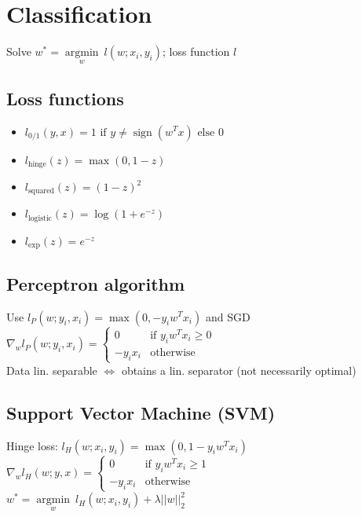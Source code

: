 \section*{Classification}

Solve $w^* = \underset{w}{\operatorname{argmin}} ~ l(w;x_i,y_i)$; loss function $l$

\subsection*{Loss functions}
\begin{itemize}
	\item $l_{0/1} (y,x) = 1 \text{ if } y \neq \operatorname{sign}(w^Tx) \text{ else } 0$
	\item $l_{\text{hinge}}(z) = \max(0,1-z) $
	\item $l_{\text{squared}}(z) = (1-z)^2$
	\item $l_{\text{logistic}}(z) = \log(1+e^{-z})$
	\item $l_{\text{exp}}(z) = e^{-z}$
\end{itemize}

\subsection*{Perceptron algorithm}
Use $l_P (w;y_i,x_i) = \operatorname{max}(0, -y_i w^T x_i)$ and SGD\\
$\nabla_w l_P(w;y_i,x_i) = 
\begin{cases}
    0 &\text{if } y_i w^T x_i \geq 0\\
    -y_i x_i &\text{otherwise}
\end{cases}$ \\
Data lin. separable $\Leftrightarrow$ obtains a lin. separator (not necessarily optimal)

\subsection*{Support Vector Machine (SVM)}
Hinge loss: $l_H(w;x_i,y_i) = \operatorname{max}(0,1-y_i w^T x_i)$ \\
$\nabla_w l_H(w;y,x) = 
\begin{cases}
    0 &\text{if } y_i w^T x_i \geq 1\\
    -y_i x_i &\text{otherwise}
\end{cases}$\\
$w^* = \underset{w}{\operatorname{argmin}} ~ l_H(w;x_i,y_i) + \lambda||w||_2^2$

